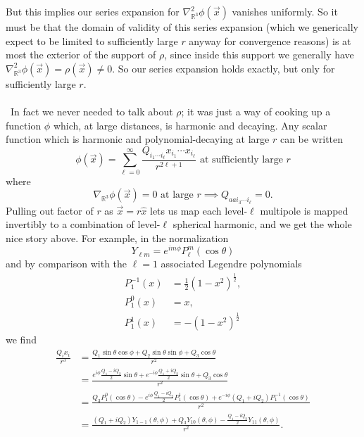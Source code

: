 \documentclass[11pt,letterpaper]{article}
\newcommand{\R}{\mathbb{R}}
\begin{document}
But this implies our series expansion for $\nabla^2_{\R^3} \phi(\vec{x})$ vanishes uniformly. So it must be that the domain of validity of this series expansion (which we generically expect to be limited to sufficiently large $r$ anyway for convergence reasons) is at most the exterior of the support of $\rho$, since inside this support we generally have $\nabla^2_{\R^3} \phi(\vec{x}) = \rho(\vec{x}) \neq 0$. So our series expansion holds exactly, but only for sufficiently large $r$. \\
\\
\
In fact we never needed to talk about $\rho$; it was just a way of cooking up a function $\phi$ which, at large distances, is harmonic and decaying. Any scalar function which is harmonic and polynomial-decaying at large $r$ can be written \begin{equation}
\phi(\vec{x}) = \sum_{\ell = 0}^\infty \frac{Q_{i_1 \cdots i_\ell} x_{i_1} \cdots x_{i_\ell}}{r^{2 \ell + 1}} \mbox{ at sufficiently large } r
\end{equation}
where \begin{equation}
\nabla_{\R^3} \phi(\vec{x}) = 0 \mbox{ at large $r$} \implies Q_{aa i_3 \cdots i_\ell} = 0.
\end{equation}
Pulling out factor of $r$ as $\vec{x} = r \hat{x}$ lets us map each level-$\ell$ multipole is mapped invertibly to a combination of level-$\ell$ spherical harmonic, and we get the whole nice story above. For example, in the normalization \begin{equation}
Y_{\ell m} = e^{i m \phi} P_\ell ^m(\cos \theta)
\end{equation}
and by comparison with the $\ell = 1$ associated Legendre polynomials \begin{equation}
\begin{aligned}
P_1^{-1} (x) & = \frac{1}{2} (1 - x^2)^{\frac{1}{2}}, \\
P_1^0 (x) & = x, \\
P_1^1 (x) & = - (1 - x^2)^{\frac{1}{2}}
\end{aligned}
\end{equation}
we find \begin{equation}
\begin{aligned}
\frac{Q_i x_i}{r^3} & = \frac{ Q_1 \sin \theta \cos \phi + Q_2 \sin \theta \sin \phi+ Q_3 \cos \theta}{r^2} \\
& = \frac{e^{i \phi} \frac{Q_1  - i Q_2 }{2} \sin \theta + e^{- i \phi} \frac{Q_1  + i Q_2 }{2}\sin \theta + Q_3 \cos \theta}{r^2 } \\
& = \frac{Q_3 P_1^0(\cos \theta) - e^{i \phi} \frac{Q_1 - i Q_2}{2} P_1^1(\cos \theta) + e^{- i \phi} (Q_1 + i Q_2) P_1^{-1} (\cos \theta)}{r^2} \\
& = \frac{(Q_1 + i Q_2) Y_{1 -1} (\theta, \phi) + Q_3 Y_{10} (\theta, \phi) - \frac{Q_1 - i Q_2}{2} Y_{11}(\theta, \phi)}{r^2}.
\end{aligned}
\end{equation}
\end{document}
